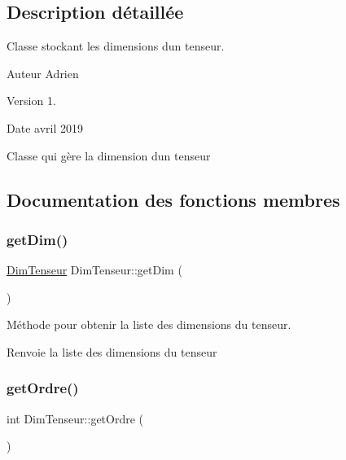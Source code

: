 \subsection{Description détaillée}
Classe stockant les dimensions d\textquotesingle{}un tenseur. 

\begin{DoxyAuthor}{Auteur}
Adrien 
\end{DoxyAuthor}
\begin{DoxyVersion}{Version}
1. 
\end{DoxyVersion}
\begin{DoxyDate}{Date}
avril 2019
\end{DoxyDate}
Classe qui gère la dimension d\textquotesingle{}un tenseur 

\subsection{Documentation des fonctions membres}
\mbox{\label{classDimTenseur_a987995f83a0c8debb5f75edb59dad3b0}} 
\subsubsection{\texorpdfstring{get\+Dim()}{getDim()}}
{\footnotesize\ttfamily \hyperlink{classDimTenseur}{Dim\+Tenseur} Dim\+Tenseur\+::get\+Dim (\begin{DoxyParamCaption}{ }\end{DoxyParamCaption})}



Méthode pour obtenir la liste des dimensions du tenseur. 

\begin{DoxyReturn}{Renvoie}
la liste des dimensions du tenseur 
\end{DoxyReturn}
\mbox{\label{classDimTenseur_a0d1e2833c775440baad2ac390cc6e135}} 
\subsubsection{\texorpdfstring{get\+Ordre()}{getOrdre()}}
{\footnotesize\ttfamily int Dim\+Tenseur\+::get\+Ordre (\begin{DoxyParamCaption}{ }\end{DoxyParamCaption})}



